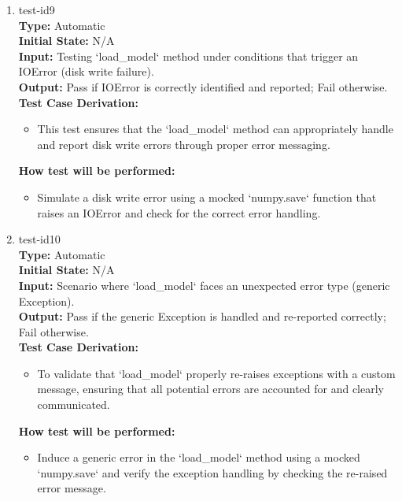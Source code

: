 \documentclass[12pt, titlepage]{article}
\begin{document}
\begin{enumerate}
  \item{test-id9\\}
  \textbf{Type:} Automatic\\
  \textbf{Initial State:} N/A\\
  \textbf{Input:} Testing `load\_model` method under conditions that trigger an 
  IOError (disk write failure).\\
  \textbf{Output:} Pass if IOError is correctly identified and reported; 
  Fail otherwise.\\
  \textbf{Test Case Derivation:}
  \begin{itemize}
      \item This test ensures that the `load\_model` method can appropriately 
      handle and report disk write errors through proper error messaging.
  \end{itemize}
  \textbf{How test will be performed:}
  \begin{itemize}
      \item Simulate a disk write error using a mocked `numpy.save` function 
      that raises an IOError and check for the correct error handling.
  \end{itemize}
  
  \item{test-id10\\}
  \textbf{Type:} Automatic\\
  \textbf{Initial State:} N/A\\
  \textbf{Input:} Scenario where `load\_model` faces an unexpected error 
  type (generic Exception).\\
  \textbf{Output:} Pass if the generic Exception is handled and re-reported 
  correctly; Fail otherwise.\\
  \textbf{Test Case Derivation:}
  \begin{itemize}
      \item To validate that `load\_model` properly re-raises exceptions
       with a custom message, ensuring that all potential errors are accounted for and clearly communicated.
  \end{itemize}
  \textbf{How test will be performed:}
  \begin{itemize}
      \item Induce a generic error in the `load\_model` method using a 
      mocked `numpy.save` and verify the exception handling by checking the re-raised error message.
  \end{itemize}
  
  \end{enumerate}
  
\end{document}
